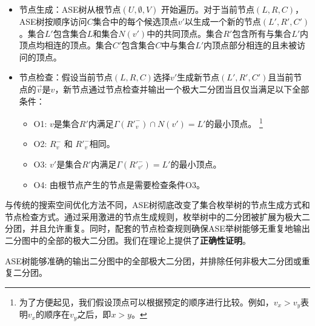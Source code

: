 \begin{itemize}
  \item 节点生成：ASE树从根节点$(U,\emptyset,V)$ 开始遍历。对于当前节点$(L,R,C)$，ASE树按顺序访问$C$集合中的每个候选顶点$v'$以生成一个新的节点$(L',R',C')$。集合$L'$包含集合$L$和集合$N(v')$中的共同顶点。集合$R'$包含所有与集合$L'$内顶点均相连的顶点。集合$C'$包含集合$C$中与集合$L'$内顶点部分相连的且未被访问的顶点。
  \item 节点检查：假设当前节点$(L,R,C)$选择$v'$生成新节点$(L',R',C')$且当前节点的$\vec{v}$是$v$，新节点通过节点检查并输出一个极大二分团当且仅当满足以下全部条件：
  
  \begin{itemize}
    \item O1: $v$是集合$R'$内满足$\Gamma({R'}_{v}^-) \cap N(v') = L'$的最小顶点。
    \footnote{为了方便起见，我们假设顶点可以根据预定的顺序进行比较。例如，$v_x > v_y$表明$v_x$的顺序在$v_y$之后，即$x > y$。}
    \item O2: ${R}_{v}^-$ 和 ${R'}_{v}^-$相同。
    \item O3: $v'$是集合$R'$内满足$\Gamma({R'}_{v'}^-) = L'$的最小顶点。
    \item O4: 由根节点产生的节点是需要检查条件O3。
  \end{itemize}
  
\end{itemize}

与传统的搜索空间优化方法不同，ASE树彻底改变了集合枚举树的节点生成方式和节点检查方式。通过采用激进的节点生成规则，枚举树中的二分团被扩展为极大二分团，并且允许重复。同时，配套的节点检查规则确保ASE举树能够无重复地输出二分图中的全部的极大二分团。我们在理论上提供了\textbf{正确性证明}。


\begin{theorem}
  \label{theorem:correctness}
  ASE树能够准确的输出二分图中的全部极大二分团，并排除任何非极大二分团或重复二分团。
\end{theorem}

